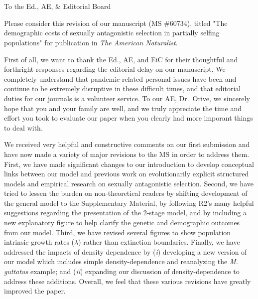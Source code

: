 \documentclass[11pt]{article}
\begin{document}




\section*{}
\noindent To the Ed., AE, \& Editorial Board
\bigskip

\noindent Please consider this revision of our manuscript (MS \#60734), titled "The demographic costs of sexually antagonistic selection in partially selfing populations" for publication in \textit{The American Naturalist}. 
\bigskip

\noindent First of all, we want to thank the Ed., AE, and EiC for their thoughtful and forthright responses regarding the editorial delay on our manuscript. We completely understand that pandemic-related personal issues have been and continue to be extremely disruptive in these difficult times, and that editorial duties for our journals is a volunteer service. To our AE, Dr.~Orive, we sincerely hope that you and your family are well, and we truly appreciate the time and effort you took to evaluate our paper when you clearly had more imporant things to deal with.
\bigskip

\noindent We received very helpful and constructive comments on our first submission and have now made a variety of major revisions to the MS in order to address them. First, we have made significant changes to our introduction to develop conceptual links between our model and previous work on evolutionarily explicit structured models and empirical research on sexually antagonistic selection. Second, we have tried to lessen the burden on non-theoretical readers by shifting development of the general model to the Supplementary Material, by following R2's many helpful suggestions regarding the presentation of the 2-stage model, and by including a new explanatory figure to help clarify the genetic and demographic outcomes from our model. Third, we have revised several figures to show population intrinsic growth rates ($\lambda$) rather than extinction boundaries. Finally, we have addressed the impacts of density dependence by ({\itshape i}) developing a new version of our model which includes simple density-dependence and reanalyzing the {\itshape M. guttatus} example; and ({\itshape ii}) expanding our discussion of density-dependence to address these additions. Overall, we feel that these various revisions have greatly improved the paper. 
\bigskip
\end{document}
